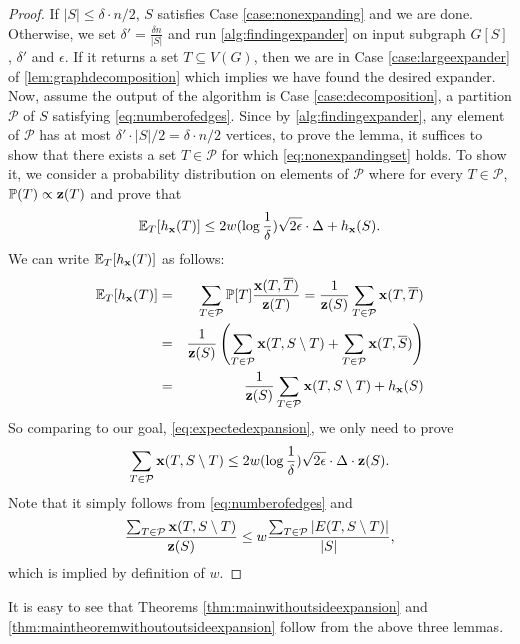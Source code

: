 \documentclass[11pt]{article}
\def\bx{{\bf x}}
\def\bz{{\bf z}}
\def\h{h}
\begin{document}
\begin{proof}
If $|S| \leq \delta \cdot n /2$, $S$ satisfies Case \ref{case:nonexpanding} and we are done. Otherwise, we set $\delta' = \frac{\delta n}{|S|}$ and run  \autoref{alg:findingexpander} on input subgraph $G[S]$, $\delta'$ and $\epsilon$. If it returns a set $T \subseteq V(G)$, then we are in Case \ref{case:largeexpander} of  \autoref{lem:graphdecomposition} which implies we have found the desired expander. Now, assume the output of the algorithm is Case 
\ref{case:decomposition}, a partition $\mathcal{P}$ of $S$ satisfying \eqref{eq:numberofedges}. Since by 
 \autoref{alg:findingexpander}, any element of $\mathcal{P}$ has at 
most $\delta' \cdot |S| /2 = \delta \cdot n /2$ vertices, to prove the lemma, it suffices to 
show that there exists a set $T \in 
\mathcal{P}$ for which \eqref{eq:nonexpandingset} holds. To show it, we consider a probability distribution on elements of $\mathcal{P}$ where for every $T \in \mathcal{P}$, $\mathbb{P}(T) \propto \bz(T)$ and prove that 
\begin{equation}
\label{eq:expectedexpansion}
\mathbb{E}_{T}[h_\bx(T)] \leq 2w(\log \frac{1}{\delta})\sqrt{2\epsilon}\cdot \Delta + \h_\bx(S).
\end{equation} 
We can write $\mathbb{E}_T [\h_\bx(T)]$ as follows: 
\begin{eqnarray*}
\mathbb{E}_T [\h_\bx(T)] &= & \sum_{T \in \mathcal{P}} \mathbb{P}[T]\frac{\bx(T,\overline{T})}{\bz(T)} 
 = \frac{1}{\bz(S)} \sum_{T \in \mathcal{P}} \bx(T,\overline{T}) \\
&=& \frac{1}{\bz(S)} \left(\sum_{T \in \mathcal{P}} \bx(T,S\setminus{T})+ \sum_{T \in \mathcal{P}} \bx(T,\overline{S})\right) \\
&= &\frac{1}{\bz(S)} \sum_{T \in \mathcal{P}} \bx(T,S\setminus{T}) + \h_\bx(S)    
\end{eqnarray*}
So comparing to our goal, \eqref{eq:expectedexpansion}, we only need to prove 
\begin{equation}
\label{eq:sumofweightsofedges}
\sum_{T \in \mathcal{P}} \bx(T,S\setminus{T}) \leq 2w(\log \frac{1}{\delta})\sqrt{2\epsilon}\cdot \Delta \cdot \bz(S).
\end{equation}
Note that it simply follows from \eqref{eq:numberofedges} and 
\begin{equation*}
\frac{\sum_{T \in \mathcal{P}} \bx(T,S\setminus{T})}{\bz(S)}\leq w
\frac{\sum_{T \in \mathcal{P}} |E(T,S\setminus{T})|}{|S|},
\end{equation*}
which is implied by definition of $w$.
\end{proof} 
It is easy to see that Theorems \ref{thm:mainwithoutsideexpansion} and \ref{thm:maintheoremwithoutoutsideexpansion} follow from the above three lemmas. 
\end{document}

